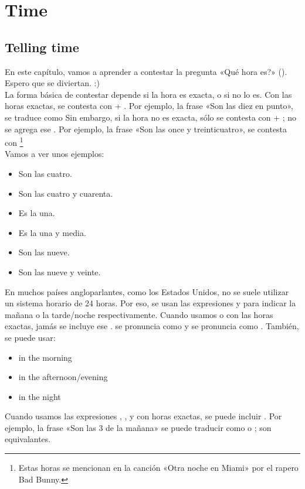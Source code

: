 \chapter{Time}

\section{Telling time}

En este cap\'itulo, vamos a aprender a contestar la pregunta «\textquestiondown Qu\'e hora es?» ().
Espero que se diviertan. :) \\

La forma b\'asica de contestar depende si la hora es exacta, o si no lo es.
Con las horas exactas, se contesta con  + .
Por ejemplo, la frase «Son las diez en punto», se traduce como 
Sin embargo, si la hora no es exacta, s\'olo se contesta con
 + ; no se agrega ese .
Por ejemplo, la frase «Son las once y treinticuatro», se contesta con 
\footnote{Estas horas se mencionan en la canci\'on «Otra noche en Miami» por el rapero Bad Bunny.} \\

Vamos a ver unos ejemplos:
\begin{itemize}
	\item Son las cuatro. \arr {}
	\item Son las cuatro y cuarenta. \arr {}
	\item Es la una. \arr {}
	\item Es la una y media. \arr {}
	\item Son las nueve. \arr {}
	\item Son las nueve y veinte. \arr {}
\end{itemize}

En muchos pa\'ises angloparlantes, como los Estados Unidos, no se suele utilizar un sistema horario de 24 horas.
Por eso, se usan las expresiones  y  para indicar la mañana o la tarde/noche respectivamente.
Cuando usamos  o  con las horas exactas, jam\'as se incluye ese .  se pronuncia como  y  se pronuncia como .
Tambi\'en, se puede usar:
\begin{itemize}
	\item in the morning \arr {}
	\item in the afternoon/evening \arr {}
	\item in the night \arr {}
\end{itemize}
Cuando usamos las expresiones , , y  con
horas exactas, se puede incluir . Por ejemplo, la frase «Son las 3 de la ma\~nana» se puede traducir
como  o ; son equivalantes. \\

